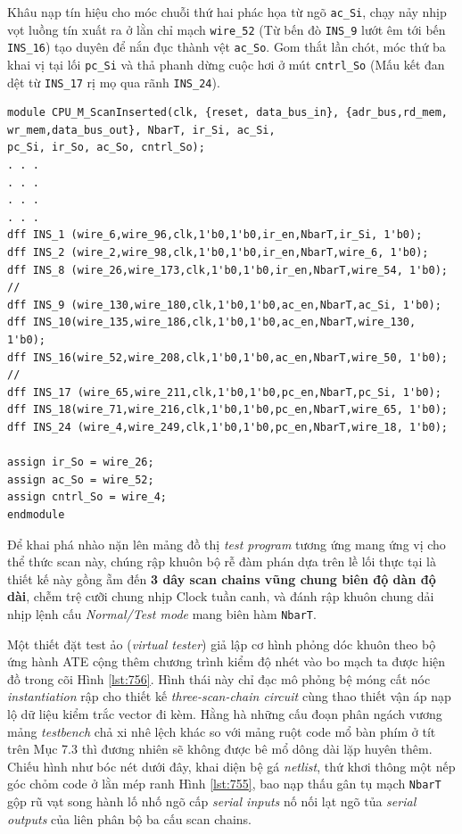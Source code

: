 Khâu nạp tín hiệu cho móc chuỗi thứ hai phác họa từ ngõ \texttt{ac\_Si}, chạy nảy nhịp vọt luồng tín xuất ra ở lằn chỉ mạch \texttt{wire\_52} (Từ bến đò \texttt{INS\_9} lướt êm tới bến \texttt{INS\_16}) tạo duyên để nắn đục thành vệt \texttt{ac\_So}. Gom thắt lần chót, móc thứ ba khai vị tại lối \texttt{pc\_Si} và thả phanh dừng cuộc hơi ở mút \texttt{cntrl\_So} (Mấu kết đan dệt từ \texttt{INS\_17} rị mọ qua rãnh \texttt{INS\_24}).

\begin{lstlisting}[caption={Hình 7.55: Chèn ba chuỗi quét (Figure 7.55 Inserting three scan chains)}, label={lst:755}]
module CPU_M_ScanInserted(clk, {reset, data_bus_in}, {adr_bus,rd_mem,
wr_mem,data_bus_out}, NbarT, ir_Si, ac_Si,
pc_Si, ir_So, ac_So, cntrl_So);
. . .
. . .
. . .
. . .
dff INS_1 (wire_6,wire_96,clk,1'b0,1'b0,ir_en,NbarT,ir_Si, 1'b0);
dff INS_2 (wire_2,wire_98,clk,1'b0,1'b0,ir_en,NbarT,wire_6, 1'b0);
dff INS_8 (wire_26,wire_173,clk,1'b0,1'b0,ir_en,NbarT,wire_54, 1'b0);
//
dff INS_9 (wire_130,wire_180,clk,1'b0,1'b0,ac_en,NbarT,ac_Si, 1'b0);
dff INS_10(wire_135,wire_186,clk,1'b0,1'b0,ac_en,NbarT,wire_130, 1'b0);
dff INS_16(wire_52,wire_208,clk,1'b0,1'b0,ac_en,NbarT,wire_50, 1'b0);
//
dff INS_17 (wire_65,wire_211,clk,1'b0,1'b0,pc_en,NbarT,pc_Si, 1'b0);
dff INS_18(wire_71,wire_216,clk,1'b0,1'b0,pc_en,NbarT,wire_65, 1'b0);
dff INS_24 (wire_4,wire_249,clk,1'b0,1'b0,pc_en,NbarT,wire_18, 1'b0);

assign ir_So = wire_26;
assign ac_So = wire_52;
assign cntrl_So = wire_4;
endmodule
\end{lstlisting}

Để khai phá nhào nặn lên mảng đồ thị \textit{test program} tương ứng mang ứng vị cho thể thức scan này, chúng rập khuôn bộ rễ đàm phán dựa trên lề lối thực tại là thiết kế này gồng ẵm đến \textbf{3 dây scan chains vũng chung biên độ dàn độ dài}, chễm trệ cưỡi chung nhịp Clock tuần canh, và đánh rập khuôn chung dải nhịp lệnh cấu \textit{Normal/Test mode} mang biên hàm \texttt{NbarT}.

Một thiết đặt test ảo (\textit{virtual tester}) giả lập cơ hình phỏng dóc khuôn theo bộ ứng hành ATE cộng thêm chương trình kiểm độ nhét vào bo mạch ta được hiện đồ trong cõi Hình \ref{lst:756}. Hình thái này chỉ đạc mô phỏng bệ móng cất nóc \textit{instantiation} rập cho thiết kế \textit{three-scan-chain circuit} cùng thao thiết vận áp nạp lộ dữ liệu kiểm trắc vector đi kèm. Hằng hà những cấu đoạn phân ngách vương mảng \textit{testbench} chả xi nhê lệch khác so với mảng ruột code mổ bàn phím ở tít trên Mục 7.3 thì đương nhiên sẽ không được bê mổ dông dài lặp huyên thêm. Chiếu hình như bóc nét dưới đây, khai diện bệ gá \textit{netlist}, thứ khơi thông một nếp góc chỏm code ở lằn mép ranh Hình \ref{lst:755}, bao nạp thấu gân tụ mạch \texttt{NbarT} gộp rũ vạt song hành lố nhố ngõ cấp \textit{serial inputs} nố nối lạt ngõ tủa \textit{serial outputs} của liên phân bộ ba cấu scan chains.

